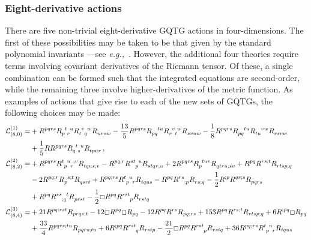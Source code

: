 \documentclass[11pt]{article}
\newcommand{\eg}{{\it e.g.,}\ }
\begin{document}
{\subsubsection{Eight-derivative actions}
There are five non-trivial eight-derivative GQTG actions in four-dimensions. The first of these possibilities may be taken to be that given by the standard polynomial invariants ---see \eg \cite{PabloPablo4}. However, the additional four theories require terms involving covariant derivatives of the Riemann tensor. Of these, a single combination can be formed such that the integrated equations are second-order, while the remaining three involve higher-derivatives of the metric function. As examples of actions that give rise to each of the new sets of GQTGs, the following choices may be made:
\begin{align}
\mathcal{L}_{(8,0)}^{(1)} =&+ \tensor{R}{^{pqrs}} \tensor{R}{_p^t_r^u} \tensor{R}{_t^v_q^w} \tensor{R}{_{uvsw}}  - \frac{13}{5} \tensor{R}{^{pqrs}} \tensor{R}{_{pq}^{tu}} \tensor{R}{_r^v_t^w} \tensor{R}{_{svuw}}  - \frac{1}{8} \tensor{R}{^{pqrs}} \tensor{R}{_{pq}^{tu}} \tensor{R}{_{tu}^{vw}} \tensor{R}{_{rsvw}}  
\nonumber\\
&+ \frac{1}{5} R \tensor{R}{^{pqrs}} \tensor{R}{_q^t_s^u}\tensor{R}{_{tpur}}  \, ,
\\
\mathcal{L}_{(8,2)}^{(2)} =&+ \tensor{R}{^{pqrs}} \tensor{R}{^t_p^u_r ^{;v}} \tensor{R}{_{tqus;v}} - \tensor{R}{^{pq;r}} \tensor{R}{^{st}_p^u} \tensor{R}{_{stqr;u}} + 2 \tensor{R}{^{pqrs}} \tensor{R}{_p ^{tuv}} \tensor{R}{_{qtru;sv}} + \tensor{R}{^{pq}} \tensor{R}{^{rs;t}} \tensor{R}{_{rtsp;q}} 
\nonumber\\
&- 2 \tensor{R}{^{pq;r}} \tensor{R}{_p ^{s;t}} \tensor{R}{_{qsrt}} + \tensor{R}{^{pq;rs}} \tensor{R}{^t_p^u_r}\tensor{R}{_{tqus}} 
-\tensor{R}{^{pq}} \tensor{R}{^{rs}_{;p}} \tensor{R}{_{rs;q}} - \frac{1}{2} \tensor{R}{^{;p}} \tensor{R}{^{qr;s}} \tensor{R}{_{pqrs}}\nonumber\\
& + \tensor{R}{^{pq}} \tensor{R}{^{rs}_{;q}^t} \tensor{R}{_{prst}} 
- \frac{1}{2} \Box  \tensor{R}{^{pq}} \tensor{R}{^{rst}_p} \tensor{R}{_{rstq}} 
\\
\mathcal{L}_{(8,4)}^{(3)} =&+ 21 R^{pq;rst} R_{prqs;t} - 12 \Box R^{pq} \Box R_{pq} - 12 R^{pq} R^{rs} R_{pq;rs} + 153 R^{pq} R^{rs;t} R_{rtsp;q} + 6 R^{;pq} \Box R_{pq} 
\nonumber\\
&+ \frac{33}{4} R^{pqrs;tu} R_{pqrs;tu} + 6 R^{;pq} \tensor{R}{^{rst}_q} R_{rstp} - \frac{21}{2} \Box R^{pq} \tensor{R}{^{rst}_p} R_{rstq} + 36 R^{pq;rs} \tensor{R}{^t_p^u_r} R_{tqus} 

\end{align}}
\end{document}
